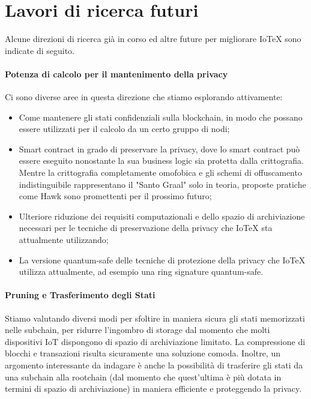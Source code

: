 \section{Lavori di ricerca futuri}
Alcune direzioni di ricerca già in corso ed altre future per migliorare IoTeX sono indicate di seguito.

\paragraph{Potenza di calcolo per il mantenimento della privacy}
Ci sono diverse aree in questa direzione che stiamo esplorando attivamente:

\begin{itemize}
    \item Come mantenere gli stati confidenziali sulla blockchain, in modo che possano essere utilizzati per il calcolo da un certo gruppo di nodi;

\item Smart contract in grado di preservare la privacy, dove lo smart contract può essere eseguito nonostante la sua business logic sia protetta dalla crittografia. Mentre la crittografia completamente omofobica \cite{c26} e gli schemi di offuscamento indistinguibile \cite{c11} rappresentano il "Santo Graal" solo in teoria, proposte pratiche come Hawk \cite{c17} sono promettenti per il prossimo futuro;

\item Ulteriore riduzione dei requisiti computazionali e dello spazio di archiviazione necessari per le tecniche di preservazione della privacy che IoTeX sta attualmente utilizzando;

\item La versione quantum-safe delle tecniche di protezione della privacy che IoTeX utilizza attualmente, ad esempio una ring signature quantum-safe.
\end{itemize}


\paragraph{Pruning e Trasferimento degli Stati}
Stiamo valutando diversi modi per sfoltire in maniera sicura gli stati memorizzati nelle subchain, per ridurre l'ingombro di storage dal momento che molti dispositivi IoT dispongono di spazio di archiviazione limitato. La compressione di blocchi e transazioni risulta sicuramente una soluzione comoda. Inoltre, un argomento interessante da indagare è anche la possibilità di trasferire gli stati da una subchain alla rootchain (dal momento che quest'ultima è più dotata in termini di spazio di archiviazione) in maniera efficiente e proteggendo la privacy.

